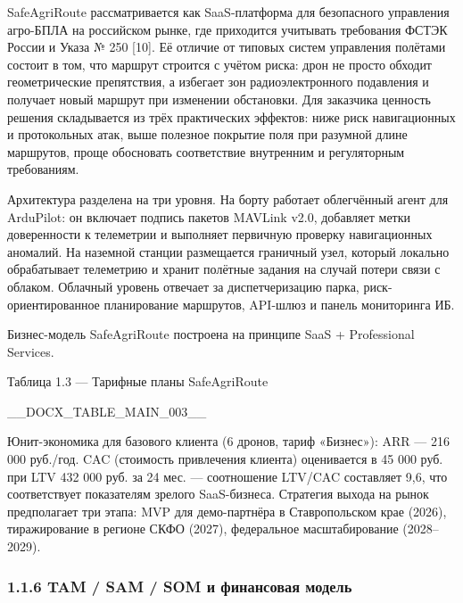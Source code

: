 \documentclass[14pt,a4paper]{extarticle}
\begin{document}
SafeAgriRoute рассматривается как SaaS-платформа для безопасного управления агро-БПЛА на российском рынке, где приходится учитывать требования ФСТЭК России и Указа № 250 {[}10{]}. Её отличие от типовых систем управления полётами состоит в том, что маршрут строится с учётом риска: дрон не просто обходит геометрические препятствия, а избегает зон радиоэлектронного подавления и получает новый маршрут при изменении обстановки. Для заказчика ценность решения складывается из трёх практических эффектов: ниже риск навигационных и протокольных атак, выше полезное покрытие поля при разумной длине маршрутов, проще обосновать соответствие внутренним и регуляторным требованиям.

Архитектура разделена на три уровня. На борту работает облегчённый агент для ArduPilot: он включает подпись пакетов MAVLink v2.0, добавляет метки доверенности к телеметрии и выполняет первичную проверку навигационных аномалий. На наземной станции размещается граничный узел, который локально обрабатывает телеметрию и хранит полётные задания на случай потери связи с облаком. Облачный уровень отвечает за диспетчеризацию парка, риск-ориентированное планирование маршрутов, API-шлюз и панель мониторинга ИБ.

Бизнес-модель SafeAgriRoute построена на принципе SaaS + Professional Services.

Таблица 1.3 --- Тарифные планы SafeAgriRoute



__DOCX_TABLE_MAIN_003__



Юнит-экономика для базового клиента (6 дронов, тариф «Бизнес»): ARR --- 216 000 руб./год. CAC (стоимость привлечения клиента) оценивается в 45 000 руб. при LTV 432 000 руб. за 24 мес. --- соотношение LTV/CAC составляет 9,6, что соответствует показателям зрелого SaaS-бизнеса. Стратегия выхода на рынок предполагает три этапа: MVP для демо-партнёра в Ставропольском крае (2026), тиражирование в регионе СКФО (2027), федеральное масштабирование (2028--2029).

\hypertarget{tam-sam-som-ux438-ux444ux438ux43dux430ux43dux441ux43eux432ux430ux44f-ux43cux43eux434ux435ux43bux44c}{%
\subsubsection{1.1.6 TAM / SAM / SOM и финансовая модель}\label{tam-sam-som-ux438-ux444ux438ux43dux430ux43dux441ux43eux432ux430ux44f-ux43cux43eux434ux435ux43bux44c}}
\end{document}
